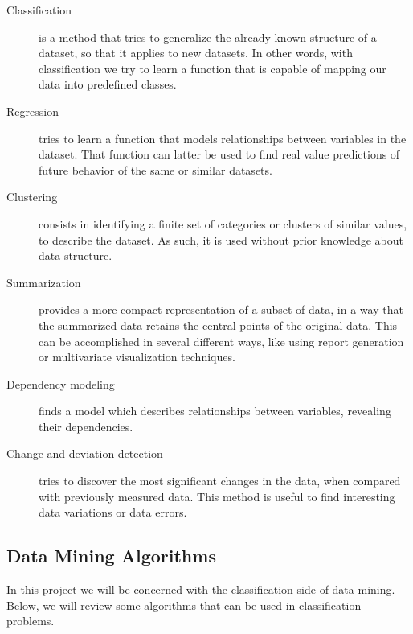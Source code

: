 \begin{description}

  \item[Classification]
  is a method that tries to generalize the already known structure of a
  dataset, so that it applies to new datasets. In other words, with
  classification we try to learn a function that is capable of mapping our data
  into predefined classes.

  \item[Regression]
  tries to learn a function that models relationships between variables in the
  dataset. That function can latter be used to find real value predictions of
  future behavior of the same or similar datasets.

  \item[Clustering]
  consists in identifying a finite set of categories or clusters of similar
  values, to describe the dataset. As such, it is used without prior knowledge
  about data structure.

  \item[Summarization]
  provides a more compact representation of a subset of data, in a way that the
  summarized data retains the central points of the original data. This can be
  accomplished in several different ways, like using report generation or
  multivariate visualization techniques.

  \item[Dependency modeling]
  finds a model which describes relationships between variables, revealing their
  dependencies.

  \item[Change and deviation detection]
  tries to discover the most significant changes in the data, when compared with
  previously measured data. This method is useful to find interesting data
  variations or data errors.

\end{description}

\subsection{Data Mining Algorithms}\label{sec:minalgo}

In this project we will be concerned with the classification side of data
mining. Below, we will review some algorithms that can be used in
classification problems.


